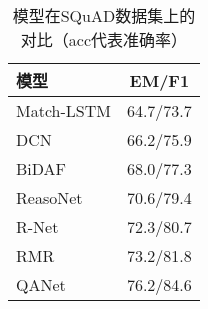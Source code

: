 \begin{table}[ht]
	\centering
	\caption{模型在SQuAD数据集上的对比（acc代表准确率）}
	\begin{tabular}{l c}
		\toprule
		模型&EM/F1\\
		\midrule
		Match-LSTM\upcite{MatchLSTM}& 64.7/73.7\\
		\midrule
		DCN\upcite{DCN}& 66.2/75.9\\
		\midrule
		BiDAF\upcite{BiDAF}&68.0/77.3\\
		\midrule
		ReasoNet\upcite{Reasonet}&70.6/79.4\\
		\midrule
		R-Net\upcite{RNet}&72.3/80.7 \\
		\midrule
		RMR\upcite{RMR}&73.2/81.8 \\
		\midrule
		QANet\upcite{QANet}& 76.2/84.6\\
		\bottomrule
	\end{tabular}
\end{table}
